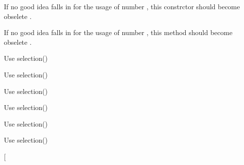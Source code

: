 
\begin{DoxyRefList}
\item[\label{deprecated__deprecated000012}%
\hypertarget{deprecated__deprecated000012}{}%
Member \hyperlink{classmdt_error_a377c175cc8e1aeae543cae2ecc5ca87b}{mdt\-Error\-:\-:mdt\-Error} (int number, const Q\-String \&text, level\-\_\-t level)]If no good idea falls in for the usage of number , this constrctor should become obselete .  
\item[\label{deprecated__deprecated000013}%
\hypertarget{deprecated__deprecated000013}{}%
Member \hyperlink{classmdt_error_ad233adb8efe4180b85f584c5afdd49fc}{mdt\-Error\-:\-:number} () const ]If no good idea falls in for the usage of number , this method should become obselete .  
\item[\label{deprecated__deprecated000003}%
\hypertarget{deprecated__deprecated000003}{}%
Member \hyperlink{classmdt_sql_selection_dialog_ae5582bd717078a137dd71d5a1b9cc9f9}{mdt\-Sql\-Selection\-Dialog\-:\-:add\-Selection\-Result\-Column} (const Q\-String \&field)]Use selection()  
\item[\label{deprecated__deprecated000007}%
\hypertarget{deprecated__deprecated000007}{}%
Member \hyperlink{classmdt_sql_selection_dialog_aab4943bc01e64f867791c15eea613e23}{mdt\-Sql\-Selection\-Dialog\-:\-:selected\-Data} (int row, const Q\-String \&field\-Name)]Use selection()  
\item[\label{deprecated__deprecated000004}%
\hypertarget{deprecated__deprecated000004}{}%
Member \hyperlink{classmdt_sql_selection_dialog_affdf9a9936509c8b6ca141b8ff415995}{mdt\-Sql\-Selection\-Dialog\-:\-:selected\-Data\-Record} ()]Use selection()  
\item[\label{deprecated__deprecated000005}%
\hypertarget{deprecated__deprecated000005}{}%
Member \hyperlink{classmdt_sql_selection_dialog_a23592c799f3b8945b3f5e72082dc265b}{mdt\-Sql\-Selection\-Dialog\-:\-:selection\-Result} ()]Use selection()  
\item[\label{deprecated__deprecated000006}%
\hypertarget{deprecated__deprecated000006}{}%
Member \hyperlink{classmdt_sql_selection_dialog_a85b7c1e3e156c141315d0873fa36d4b3}{mdt\-Sql\-Selection\-Dialog\-:\-:selection\-Results} ()]Use selection()  
\item[\label{deprecated__deprecated000002}%
\hypertarget{deprecated__deprecated000002}{}%
Member \hyperlink{classmdt_sql_selection_dialog_a5c5c36414bf3c432979f53ad27f985cb}{mdt\-Sql\-Selection\-Dialog\-:\-:set\-Selection\-Result\-Columns} (const Q\-String\-List \&fields)]Use selection()  
\item[\label{deprecated__deprecated000001}%

\end{DoxyRefList}
